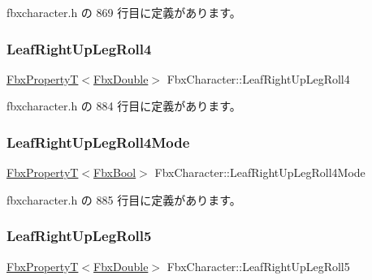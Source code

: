  fbxcharacter.\+h の 869 行目に定義があります。

\mbox{\label{class_fbx_character_a8074fc6f22e54d9857b7a4404b3e1a38}} 
\subsubsection{\texorpdfstring{Leaf\+Right\+Up\+Leg\+Roll4}{LeafRightUpLegRoll4}}
{\footnotesize\ttfamily \hyperlink{class_fbx_property_t}{Fbx\+PropertyT}$<$\hyperlink{fbxtypes_8h_a171e72a1c46fc15c1a6c9c31948c1c5b}{Fbx\+Double}$>$ Fbx\+Character\+::\+Leaf\+Right\+Up\+Leg\+Roll4}



 fbxcharacter.\+h の 884 行目に定義があります。

\mbox{\label{class_fbx_character_a76523d2ef3801ccbed39bfa5fd4cb714}} 
\subsubsection{\texorpdfstring{Leaf\+Right\+Up\+Leg\+Roll4\+Mode}{LeafRightUpLegRoll4Mode}}
{\footnotesize\ttfamily \hyperlink{class_fbx_property_t}{Fbx\+PropertyT}$<$\hyperlink{fbxtypes_8h_a92e0562b2fe33e76a242f498b362262e}{Fbx\+Bool}$>$ Fbx\+Character\+::\+Leaf\+Right\+Up\+Leg\+Roll4\+Mode}



 fbxcharacter.\+h の 885 行目に定義があります。

\mbox{\label{class_fbx_character_a721b30be79d830818b6402e68352731a}} 
\subsubsection{\texorpdfstring{Leaf\+Right\+Up\+Leg\+Roll5}{LeafRightUpLegRoll5}}
{\footnotesize\ttfamily \hyperlink{class_fbx_property_t}{Fbx\+PropertyT}$<$\hyperlink{fbxtypes_8h_a171e72a1c46fc15c1a6c9c31948c1c5b}{Fbx\+Double}$>$ Fbx\+Character\+::\+Leaf\+Right\+Up\+Leg\+Roll5}




